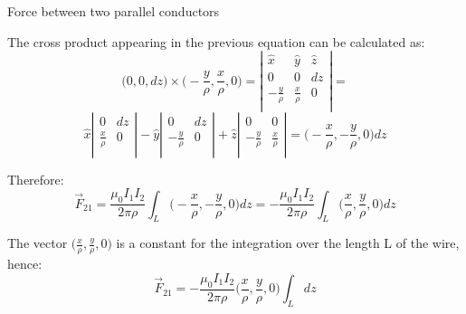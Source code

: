 %
%
%

\begin{frame}{Force between two parallel conductors}

The cross product appearing in the previous equation can be calculated as:
\begin{equation*}
  \Big( 0, 0, dz \Big) \times \Big( -\frac{y}{\rho}, \frac{x}{\rho}, 0 \Big) =
   \left|
    \begin{array}{ccc}
      \hat{x}       & \hat{y}     & \hat{z} \\
       0            &  0          &  dz     \\
       -\frac{y}{\rho} & \frac{x}{\rho} &  0      \\
    \end{array}
   \right| =
\end{equation*}
\begin{equation*}
   \hat{x}
   \left|
    \begin{array}{cc}
       0          &  dz     \\
      \frac{x}{\rho} &  0      \\
    \end{array}
   \right| -
   \hat{y}
   \left|
    \begin{array}{cc}
       0            &  dz     \\
       -\frac{y}{\rho} &  0      \\
    \end{array}
   \right| +
   \hat{z}
   \left|
    \begin{array}{cc}
       0            &  0          \\
       -\frac{y}{\rho} & \frac{x}{\rho} \\
    \end{array}
   \right| =
  \Big( -\frac{x}{\rho}, -\frac{y}{\rho}, 0 \Big) dz
\end{equation*}

\vspace{0.1cm}

Therefore:
\begin{equation*}
  \vec{F}_{21} =
     \frac{\mu_0 I_{1} I_{2}}{2\pi \rho} \int_{L} \Big( -\frac{x}{\rho}, -\frac{y}{\rho}, 0 \Big) dz =
     - \frac{\mu_0 I_{1} I_{2}}{2\pi \rho} \int_{L} \Big(\frac{x}{\rho}, \frac{y}{\rho}, 0 \Big) dz
\end{equation*}

The vector $\Big(\frac{x}{\rho}, \frac{y}{\rho}, 0 \Big)$ is a
constant for the integration over the length L of the wire, hence:
\begin{equation*}
  \vec{F}_{21} =
       - \frac{\mu_0 I_{1} I_{2}}{2\pi \rho} \Big(\frac{x}{\rho}, \frac{y}{\rho}, 0 \Big) \int_{L} dz
\end{equation*}

\end{frame}


